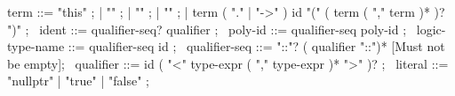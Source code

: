 \begin{syntax}
term ::= "this" ;
  | "\this" ;
  | "\count" ;
  | "\data" ;
  | term ( "." | "->" ) id "(" ( term ( "," term )* )? ")" ;
\
ident ::=  qualifier-seq? qualifier ;
\
poly-id ::= qualifier-seq poly-id ;
\
logic-type-name ::= qualifier-seq id ;
\
qualifier-seq ::= "::"? ( qualifier "::")* [Must not be empty];
\
qualifier ::= id ( "<" type-expr ( "," type-expr )* ">" )? ;
\
literal ::= "nullptr" | "true" | "false" ;
\end{syntax}
